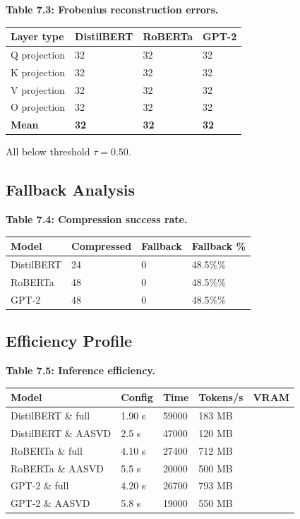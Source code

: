 \textbf{Table 7.3: Frobenius reconstruction errors.}

\begin{table}[H]
\centering
\small
\begin{tabular}{llll}
\toprule
\textbf{Layer type} & \textbf{DistilBERT} & \textbf{RoBERTa} & \textbf{GPT-2} \\
\midrule
Q projection & 32 & 32 & 32 \\
K projection & 32 & 32 & 32 \\
V projection & 32 & 32 & 32 \\
O projection & 32 & 32 & 32 \\
\textbf{Mean} & \textbf{32} & \textbf{32} & \textbf{32} \\
\bottomrule
\end{tabular}
\end{table}

All below threshold $\tau = 0.50$.

\subsection{Fallback Analysis}

\textbf{Table 7.4: Compression success rate.}

\begin{table}[H]
\centering
\small
\begin{tabular}{llll}
\toprule
\textbf{Model} & \textbf{Compressed} & \textbf{Fallback} & \textbf{Fallback \%} \\
\midrule
DistilBERT & 24 & 0 & 48.5\%\% \\
RoBERTa & 48 & 0 & 48.5\%\% \\
GPT-2 & 48 & 0 & 48.5\%\% \\
\bottomrule
\end{tabular}
\end{table}

\subsection{Efficiency Profile}

\textbf{Table 7.5: Inference efficiency.}

\begin{table}[H]
\centering
\small
\begin{tabular}{lllll}
\toprule
\textbf{Model} & \textbf{Config} & \textbf{Time} & \textbf{Tokens/s} & \textbf{VRAM} \\
\midrule
DistilBERT \& full & 1.90 s & 59000 & 183 MB \\
DistilBERT \& AASVD & 2.5 s & 47000 & 120 MB \\
RoBERTa \& full & 4.10 s & 27400 & 712 MB \\
RoBERTa \& AASVD & 5.5 s & 20000 & 500 MB \\
GPT-2 \& full & 4.20 s & 26700 & 793 MB \\
GPT-2 \& AASVD & 5.8 s & 19000 & 550 MB \\
\bottomrule
\end{tabular}
\end{table}

